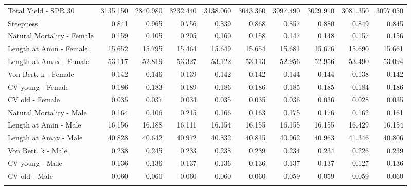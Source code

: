 \documentclass[12pt,]{article}
\begin{document}
\begin{landscape}
\begin{longtable}{lrrrrrrrrr}
  Total Yield - SPR 30 & 3135.150 & 2840.980 & 3232.440 & 3138.060 & 3043.360 & 3097.490 & 3029.910 & 3081.350 & 3097.050 \\ 
  Steepness & 0.841 & 0.965 & 0.756 & 0.839 & 0.868 & 0.857 & 0.880 & 0.849 & 0.845 \\ 
  Natural Mortality - Female & 0.159 & 0.105 & 0.205 & 0.160 & 0.158 & 0.147 & 0.148 & 0.157 & 0.156 \\ 
  Length at Amin - Female & 15.652 & 15.795 & 15.464 & 15.649 & 15.654 & 15.681 & 15.676 & 15.690 & 15.661 \\ 
  Length at Amax - Female & 53.117 & 52.819 & 53.327 & 53.122 & 53.113 & 52.956 & 52.956 & 53.490 & 53.094 \\ 
  Von Bert. k - Female & 0.142 & 0.146 & 0.139 & 0.142 & 0.142 & 0.144 & 0.144 & 0.138 & 0.142 \\ 
  CV young - Female & 0.186 & 0.183 & 0.189 & 0.186 & 0.186 & 0.185 & 0.185 & 0.184 & 0.186 \\ 
  CV old - Female & 0.035 & 0.037 & 0.034 & 0.035 & 0.035 & 0.036 & 0.036 & 0.028 & 0.035 \\ 
  Natural Mortality - Male & 0.164 & 0.106 & 0.215 & 0.166 & 0.163 & 0.175 & 0.176 & 0.162 & 0.161 \\ 
  Length at Amin - Male & 16.156 & 16.188 & 16.111 & 16.154 & 16.155 & 16.155 & 16.155 & 16.429 & 16.154 \\ 
  Length at Amax - Male & 40.828 & 40.642 & 40.972 & 40.832 & 40.815 & 40.962 & 40.963 & 41.346 & 40.806 \\ 
  Von Bert. k - Male & 0.238 & 0.245 & 0.233 & 0.238 & 0.239 & 0.234 & 0.234 & 0.226 & 0.239 \\ 
  CV young - Male & 0.136 & 0.136 & 0.137 & 0.136 & 0.136 & 0.137 & 0.137 & 0.127 & 0.136 \\ 
  CV old - Male & 0.060 & 0.060 & 0.060 & 0.060 & 0.060 & 0.059 & 0.059 & 0.059 & 0.060 \\ 
   \hline
\hline
\label{tab:sens_table}
\end{longtable}
\endgroup
\end{landscape}

\newpage

\FloatBarrier 
\end{document}
